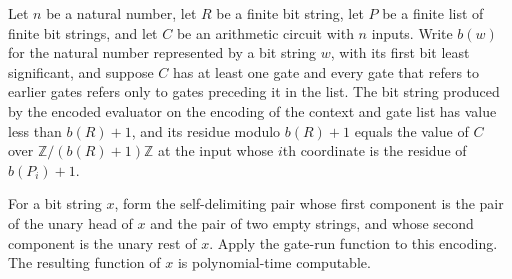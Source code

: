\begin{theorem}
\label{Randomized.PIT.evalModW_spec}
\leanok
{}
Let $n$ be a natural number, let $R$ be a finite bit string, let $P$ be a finite list of
finite bit strings, and let $C$ be an arithmetic circuit with $n$ inputs. Write $b(w)$
for the natural number represented by a bit string $w$, with its first bit least
significant, and suppose $C$ has at least one gate and every gate that refers to earlier
gates refers only to gates preceding it in the list. The bit string produced by the
encoded evaluator on the encoding of the context and gate list has value less than
$b(R)+1$, and its residue modulo $b(R)+1$ equals the value of $C$ over
$\mathbb{Z}/(b(R)+1)\mathbb{Z}$ at the input whose $i$th coordinate is the residue of
$b(P_i)+1$.
\end{theorem}

\begin{theorem}
\label{Randomized.PIT.polyTimeComputable_scanRun}
\leanok
{}
For a bit string $x$, form the self-delimiting pair whose first component is the pair of
the unary head of $x$ and the pair of two empty strings, and whose second component is
the unary rest of $x$. Apply the gate-run function to this encoding. The resulting
function of $x$ is polynomial-time computable.
\end{theorem}

